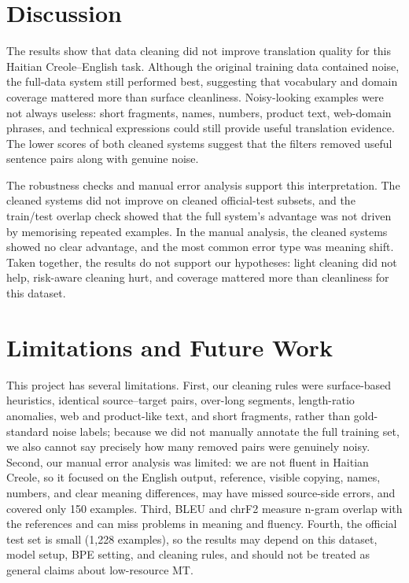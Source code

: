 \documentclass[11pt]{article}
\begin{document}
\section{Discussion}

The results show that data cleaning did not improve translation quality for this Haitian Creole--English task. Although the original training data contained noise, the full-data system still performed best, suggesting that vocabulary and domain coverage mattered more than surface cleanliness. Noisy-looking examples were not always useless: short fragments, names, numbers, product text, web-domain phrases, and technical expressions could still provide useful translation evidence. The lower scores of both cleaned systems suggest that the filters removed useful sentence pairs along with genuine noise.

The robustness checks and manual error analysis support this interpretation. The cleaned systems did not improve on cleaned official-test subsets, and the train/test overlap check showed that the full system's advantage was not driven by memorising repeated examples. In the manual analysis, the cleaned systems showed no clear advantage, and the most common error type was meaning shift. Taken together, the results do not support our hypotheses: light cleaning did not help, risk-aware cleaning hurt, and coverage mattered more than cleanliness for this dataset.

\section{Limitations and Future Work}

This project has several limitations. First, our cleaning rules were surface-based heuristics, identical source--target pairs, over-long segments, length-ratio anomalies, web and product-like text, and short fragments, rather than gold-standard noise labels; because we did not manually annotate the full training set, we also cannot say precisely how many removed pairs were genuinely noisy. Second, our manual error analysis was limited: we are not fluent in Haitian Creole, so it focused on the English output, reference, visible copying, names, numbers, and clear meaning differences, may have missed source-side errors, and covered only 150 examples. Third, BLEU and chrF2 measure n-gram overlap with the references and can miss problems in meaning and fluency. Fourth, the official test set is small (1,228 examples), so the results may depend on this dataset, model setup, BPE setting, and cleaning rules, and should not be treated as general claims about low-resource MT.
\end{document}
